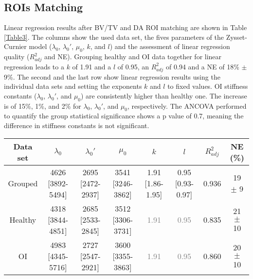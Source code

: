 \documentclass[a4paper,fleqn]{DC_ArtStyle}
\begin{document}
\subsection{ROIs Matching}
Linear regression results after BV/TV and DA ROI matching are shown in Table \ref{Table3}. The columns show the used data set, the fives parameters of the Zysset-Curnier model ($\lambda_0$, $\lambda_0'$, $\mu_0$, $k$, and $l$) and the assessment of linear regression quality ($R^2_{adj}$ and NE). Grouping healthy and OI data together for linear regression leads to a $k$ of 1.91 and a $l$ of 0.95, an $R^2_{adj}$ of 0.94 and a NE of 18\% $\pm$ 9\%. The second and the last row show linear regression results using the individual data sets and setting the exponents $k$ and $l$ to fixed values. OI stiffness constants ($\lambda_0$, $\lambda_0'$, and $\mu_0$) are consistently higher than healthy one. The increase is of 15\%, 1\%, and 2\% for $\lambda_0$, $\lambda_0'$, and $\mu_0$, respectively. The ANCOVA performed to quantify the group statistical significance shows a p value of 0.7, meaning the difference in stiffness constants is not significant.\\

\begin{table*}[b]
	\caption{Constants obtained with BV/TV and DA matched data sets. Comparison is performed between grouped (N ROIs = 166) and separated data sets (N ROIs = 83). Values are presented as value [95\% CI] or mean $\pm$ standard deviation. Values in grey were fixed in the linear regression.}
	\label{Table3}
	\begin{tabular}{cccccccc}
		\toprule
		Data set & $\lambda_0$ & $\lambda_0'$ & $\mu_0$ & $k$ & $l$ & $R^2_{adj}$ & NE (\%) \\
		\midrule
		Grouped & 4626 [3892-5494] & 2695 [2472-2937] & 3541 [3246-3862] & 1.91 [1.86-1.95] & 0.95 [0.93-0.97] & 0.936 & 19 $\pm$ 9\\
		
		Healthy & 4318 [3844-4851] & 2685 [2533-2845] & 3512 [3306-3731] & \textcolor{gray}{1.91} & \textcolor{gray}{0.95} & 0.835 & 21 $\pm$ 10\\
		
		OI & 4983 [4345-5716] & 2727 [2547-2921] & 3600 [3355-3863] & \textcolor{gray}{1.91} & \textcolor{gray}{0.95} & 0.860 & 20 $\pm$ 10\\
		\bottomrule
	\end{tabular}
\end{table*}
\end{document}
